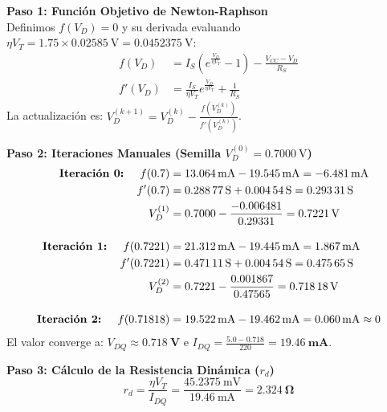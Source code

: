 \documentclass[11pt, a4paper]{article}
\begin{document}
\vspace{0.3cm}
\noindent \textbf{Paso 1: Función Objetivo de Newton-Raphson}\\
Definimos $f(V_D) = 0$ y su derivada evaluando $\eta V_T = 1.75 \times \qty{0.02585}{\volt} = \qty{0.0452375}{\volt}$:
\begin{align*}
    f(V_D) &= I_S \left( e^{\frac{V_D}{\eta V_T}} - 1 \right) - \frac{V_{CC} - V_D}{R_S} \\
    f'(V_D) &= \frac{I_S}{\eta V_T} e^{\frac{V_D}{\eta V_T}} + \frac{1}{R_S}
\end{align*}
La actualización es: $V_D^{(k+1)} = V_D^{(k)} - \frac{f(V_D^{(k)})}{f'(V_D^{(k)})}$.

\vspace{0.3cm}
\noindent \textbf{Paso 2: Iteraciones Manuales (Semilla $V_D^{(0)} = \qty{0.7000}{\volt}$)}
\begin{align*}
    \text{\textbf{Iteración 0:} } \quad f(0.7) &= \qty{13.064}{\milli\ampere} - \qty{19.545}{\milli\ampere} = \qty{-6.481}{\milli\ampere} \\
    f'(0.7) &= \qty{0.28877}{\siemens} + \qty{0.00454}{\siemens} = \qty{0.29331}{\siemens} \\
    V_D^{(1)} &= 0.7000 - \frac{-0.006481}{0.29331} = \mathbf{\qty{0.7221}{\volt}} \\[10pt]
    \text{\textbf{Iteración 1:} } \quad f(0.7221) &= \qty{21.312}{\milli\ampere} - \qty{19.445}{\milli\ampere} = \qty{+1.867}{\milli\ampere} \\
    f'(0.7221) &= \qty{0.47111}{\siemens} + \qty{0.00454}{\siemens} = \qty{0.47565}{\siemens} \\
    V_D^{(2)} &= 0.7221 - \frac{0.001867}{0.47565} = \mathbf{\qty{0.71818}{\volt}} \\[10pt]
    \text{\textbf{Iteración 2:} } \quad f(0.71818) &= \qty{19.522}{\milli\ampere} - \qty{19.462}{\milli\ampere} = \mathbf{\qty{+0.060}{\milli\ampere}} \approx 0
\end{align*}
El valor converge a: $V_{DQ} \approx \mathbf{\qty{0.718}{\volt}}$ e $I_{DQ} = \frac{5.0 - 0.718}{220} = \mathbf{\qty{19.46}{\milli\ampere}}$.

\vspace{0.3cm}
\noindent \textbf{Paso 3: Cálculo de la Resistencia Dinámica ($r_d$)}
\begin{equation}
    r_d = \frac{\eta V_T}{I_{DQ}} = \frac{\qty{45.2375}{\milli\volt}}{\qty{19.46}{\milli\ampere}} = \mathbf{\qty{2.324}{\ohm}}
\end{equation}
\end{document}
